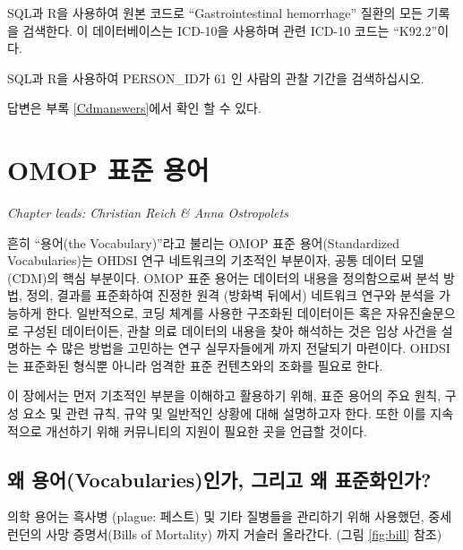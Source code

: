 \documentclass[11pt]{book}
\theoremstyle{definition}
\theoremstyle{definition}
\theoremstyle{definition}
\theoremstyle{remark}
\let\BeginKnitrBlock\begin \let\EndKnitrBlock\end
\begin{document}
\BeginKnitrBlock{exercise}
\protect\hypertarget{exr:exercisePersonSource}{}{\label{exr:exercisePersonSource}
}SQL과 R을 사용하여 원본 코드로 ``Gastrointestinal hemorrhage'' 질환의
모든 기록을 검색한다. 이 데이터베이스는 ICD-10을 사용하며 관련 ICD-10
코드는 ``K92.2''이다.
\EndKnitrBlock{exercise}

\BeginKnitrBlock{exercise}
\protect\hypertarget{exr:exercisePerson61Records}{}{\label{exr:exercisePerson61Records}
}SQL과 R을 사용하여 PERSON\_ID가 61 인 사람의 관찰 기간을 검색하십시오.
\EndKnitrBlock{exercise}

답변은 부록 \ref{Cdmanswers}에서 확인 할 수 있다.

\chapter{OMOP 표준 용어}\label{StandardizedVocabularies}


\emph{Chapter leads: Christian Reich \& Anna Ostropolets}

흔히 ``용어(the Vocabulary)''라고 불리는 OMOP 표준 용어(Standardized
Vocabularies)는 OHDSI 연구 네트워크의 기초적인 부분이자, 공통 데이터
모델(CDM)의 핵심 부분이다. OMOP 표준 용어는 데이터의 내용을 정의함으로써
분석 방법, 정의, 결과를 표준화하여 진정한 원격 (방화벽 뒤에서) 네트워크
연구와 분석을 가능하게 한다. 일반적으로, 코딩 체계를 사용한 구조화된
데이터이든 혹은 자유진술문으로 구성된 데이터이든, 관찰 의료 데이터의
내용을 찾아 해석하는 것은 임상 사건을 설명하는 수 많은 방법을 고민하는
연구 실무자들에게 까지 전달되기 마련이다. OHDSI는 표준화된 형식뿐 아니라
엄격한 표준 컨텐츠와의 조화를 필요로 한다.

이 장에서는 먼저 기초적인 부분을 이해하고 활용하기 위해, 표준 용어의
주요 원칙, 구성 요소 및 관련 규칙, 규약 및 일반적인 상황에 대해
설명하고자 한다. 또한 이를 지속적으로 개선하기 위해 커뮤니티의 지원이
필요한 곳을 언급할 것이다.

\section{왜 용어(Vocabularies)인가, 그리고 왜
표준화인가?}\label{-vocabularies---}

의학 용어는 흑사병 (plague: 페스트) 및 기타 질병들을 관리하기 위해
사용했던, 중세 런던의 사망 증명서(Bills of Mortality) 까지 거슬러
올라간다. (그림 \ref{fig:bill} 참조) 
\end{document}
